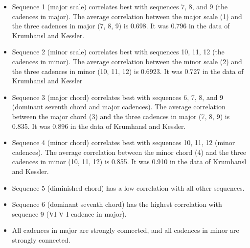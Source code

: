 \begin{itemize}
\item
Sequence 1 (major scale) correlates best with sequences 7, 8, and
9 (the cadences in major). The average correlation between the
major scale (1) and the three cadences in major (7, 8, 9) is
0.698. It was 0.796 in the data of Krumhansl and Kessler.
\item
Sequence 2 (minor scale) correlates best with sequences 10, 11, 12
(the cadences in minor). The average correlation between the minor
scale (2) and the three cadences in minor (10, 11, 12) is 0.6923.
It was 0.727 in the data of Krumhansl and Kessler
\item
Sequence 3 (major chord) correlates best with sequences 6, 7, 8,
and 9 (dominant seventh chord and major cadences). The average
correlation between the major chord (3) and the three cadences in
major (7, 8, 9) is 0.835. It was 0.896 in the data of Krumhansl
and Kessler.
\item
Sequence 4 (minor chord) correlates best with sequences 10, 11, 12
(minor cadences). The average correlation between the minor chord
(4) and the three cadences in minor (10, 11, 12) is  0.855. It was
0.910 in the data of Krumhansl and Kessler.
\item
Sequence 5 (diminished chord) has a low correlation with all other
sequences.
\item
Sequence 6 (dominant seventh chord) has the highest correlation
with sequence 9 (VI V I cadence in major).
\item
All cadences in major are strongly connected, and all cadences in
minor are strongly connected.
\end{itemize}

